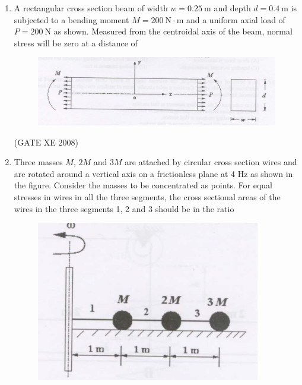\documentclass[12pt]{article}
\begin{document}
\begin{enumerate}
(GATE XE 2008)  

\item A rectangular cross section beam of width $w = 0.25 \ \text{m}$ and depth $d = 0.4 \ \text{m}$ is subjected to a bending moment $M = 200 \ \text{N} \cdot \text{m}$ and a uniform axial load of $P = 200 \ \text{N}$ as shown. Measured from the centroidal axis of the beam, normal stress will be zero at a distance of  

\begin{figure}[H]
\centering
  \includegraphics[width=0.7\columnwidth]{figs/ass1_f_q13.png}
  \caption{}
\end{figure}

\begin{enumerate}
\end{enumerate}

(GATE XE 2008)  


    \item Three masses $M$, $2M$ and $3M$ are attached by circular cross section wires and are rotated around a vertical axis on a frictionless plane at 4 Hz as shown in the figure. Consider the masses to be concentrated as points. For equal stresses in wires in all the three segments, the cross sectional areas of the wires in the three segments 1, 2 and 3 should be in the ratio

    \begin{figure}[H]
\centering
  \includegraphics[width=0.5\columnwidth]{figs/ass1_f_q14.png}
  \caption{}
\end{figure}


\end{enumerate}
\end{document}
